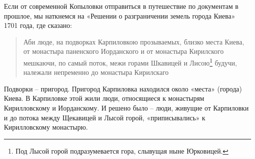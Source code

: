 \documentclass[a5paper,11pt,openany]{article}
\begin{document}





Если от современной Копыловки отправиться в путешествие по документам в прошлое, мы наткнемся на «Решении о разграничении земель города Киева» 1701 года, где сказано:

\begin{quotation}
Аби люде, на подворках Карпиловкою прозываемых, близко места Киева, от монастыра паненского Иорданского и от монастыра Кирилского мешкаючи, по самый поток, межи горами Шкавицей и Лисою\footnote{Под Лысой горой подразумевается гора, слывущая ныне Юрковицей.} будучи, належали непременно до монастыра Кирилскаго
\end{quotation}

Подворки – пригород. Пригород Карпиловка находился около «места» (города) Киева. В Карпиловке этой жили люди, относящиеся к монастырям Кирилловскому и Иорданскому. И решено было – люди, живущие от Карпиловки и до потока между Щекавицей и Лысой горой, «приписывались» к Кирилловскому монастырю. 
\end{document}
